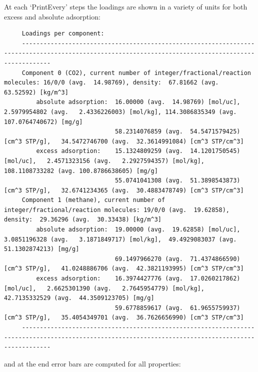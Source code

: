 At each `PrintEvery' steps the loadings are shown in a variety of units for both excess and absolute adsorption:
\begin{tiny}
\begin{verbatim}
     Loadings per component:
     ----------------------------------------------------------------------------------------------------------------------------------------------------
     Component 0 (CO2), current number of integer/fractional/reaction molecules: 16/0/0 (avg.  14.98769), density:  67.81662 (avg.  63.52592) [kg/m^3]
         absolute adsorption:  16.00000 (avg.  14.98769) [mol/uc],   2.5979954802 (avg.   2.4336226003) [mol/kg], 114.3086835349 (avg. 107.0764740672) [mg/g]
                               58.2314076859 (avg.  54.5471579425) [cm^3 STP/g],   34.5472746700 (avg.  32.3614991084) [cm^3 STP/cm^3]
         excess adsorption:    15.1324809259 (avg.  14.1201750545) [mol/uc],   2.4571323156 (avg.   2.2927594357) [mol/kg], 108.1108733282 (avg. 100.8786638605) [mg/g]
                               55.0741041308 (avg.  51.3898543873) [cm^3 STP/g],   32.6741234365 (avg.  30.4883478749) [cm^3 STP/cm^3]
     Component 1 (methane), current number of integer/fractional/reaction molecules: 19/0/0 (avg.  19.62858), density:  29.36296 (avg.  30.33438) [kg/m^3]
         absolute adsorption:  19.00000 (avg.  19.62858) [mol/uc],   3.0851196328 (avg.   3.1871849717) [mol/kg],  49.4929083037 (avg.  51.1302874213) [mg/g]
                               69.1497966270 (avg.  71.4374866590) [cm^3 STP/g],   41.0248886706 (avg.  42.3821193995) [cm^3 STP/cm^3]
         excess adsorption:    16.3974427776 (avg.  17.0260217862) [mol/uc],   2.6625301390 (avg.   2.7645954779) [mol/kg],  42.7135332529 (avg.  44.3509123705) [mg/g]
                               59.6778859617 (avg.  61.9655759937) [cm^3 STP/g],   35.4054349701 (avg.  36.7626656990) [cm^3 STP/cm^3]
     ----------------------------------------------------------------------------------------------------------------------------------------------------
\end{verbatim}
\end{tiny}
and at the end error bars are computed for all properties:
